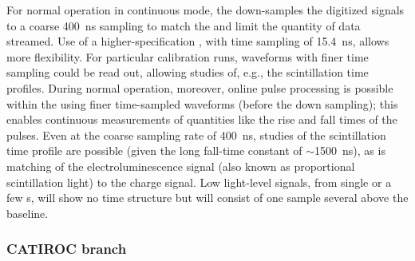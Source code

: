 For normal operation in continuous mode, the   down-samples the digitized signals to a coarse \SI{400}{ns} sampling to match the  and limit the quantity of data streamed. Use of a higher-specification , with time sampling of \SI{15.4}{ns}, allows more flexibility. For particular calibration runs, waveforms with finer time sampling could be read out, allowing studies of, e.g., the \lar scintillation time profiles. During normal operation, moreover, online pulse processing is possible within the  using finer time-sampled waveforms (before the down sampling); this %
enables continuous measurements of quantities like the rise and fall times of the pulses. Even at the coarse sampling rate of \SI{400}{ns}, studies of the \lar scintillation time profile are possible (given the long fall-time constant of $\sim$\SI{1500}{ns}), as is matching of the electroluminescence signal (also known as proportional scintillation light) to the charge signal.  Low light-level signals, from single or a few \phel{}s, will show no time structure but will consist of one sample several  above the baseline. 

\subsubsection{CATIROC branch} 

